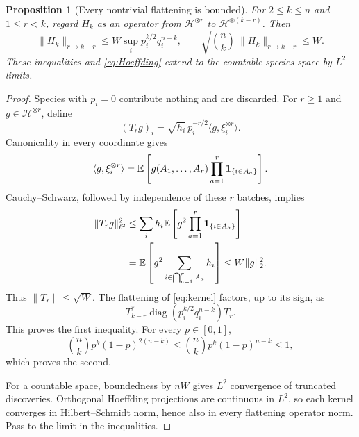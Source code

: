 \documentclass[11pt]{article}
\numberwithin{equation}{section}
\newtheorem{proposition}[theorem]{Proposition}
\theoremstyle{remark}\newtheorem{remark}[theorem]{Remark}
\newcommand{\E}{\mathbb E}\newcommand{\Pp}{\mathbb P}
\begin{document}
\begin{proposition}[Every nontrivial flattening is bounded]\label{prop:flatten}
For $2\le k\le n$ and $1\le r<k$, regard $H_k$ as an operator from
$\mathcal H^{\otimes r}$ to $\mathcal H^{\otimes(k-r)}$. Then
\begin{equation}\label{eq:flatten}
 \|H_k\|_{r\to k-r}
 \le W\sup_i p_i^{k/2}q_i^{n-k},\qquad
 \sqrt{\binom nk}\,\|H_k\|_{r\to k-r}\le W.
\end{equation}
These inequalities and \eqref{eq:Hoeffding} extend to the countable species
space by $L^2$ limits.
\end{proposition}
\begin{proof}
Species with $p_i=0$ contribute nothing and are discarded. For $r\ge1$
and $g\in\mathcal H^{\otimes r}$, define
\[
 (T_rg)_i=\sqrt{h_i}\,p_i^{-r/2}
                    \langle g,\xi_i^{\otimes r}\rangle.
\]
Canonicality in every coordinate gives
\[
 \langle g,\xi_i^{\otimes r}\rangle
   =\E\left[g(A_1,\ldots,A_r)
                    \prod_{a=1}^r\ind_{\{i\in A_a\}}\right].
\]
Cauchy--Schwarz, followed by independence of these $r$ batches, implies
\begin{align*}
 \|T_rg\|_{\ell^2}^2
 &\le\sum_i h_i\E\left[g^2
                    \prod_{a=1}^r\ind_{\{i\in A_a\}}\right]\\
 &=\E\left[g^2\sum_{i\in\bigcap_{a=1}^r A_a}h_i\right]
 \le W\|g\|_2^2.
\end{align*}
Thus $\|T_r\|\le\sqrt W$. The flattening of \eqref{eq:kernel} factors,
up to its sign, as
\[
 T_{k-r}^*\operatorname{diag}(p_i^{k/2}q_i^{n-k})T_r.
\]
This proves the first inequality. For every $p\in[0,1]$,
\[
 \binom nk p^k(1-p)^{2(n-k)}
 \le\binom nk p^k(1-p)^{n-k}\le1,
\]
which proves the second.

For a countable space, boundedness by $nW$ gives $L^2$ convergence of
truncated discoveries. Orthogonal Hoeffding projections are continuous
in $L^2$, so each kernel converges in Hilbert--Schmidt norm, hence also
in every flattening operator norm. Pass to the limit in the inequalities.
\end{proof}
\end{document}
